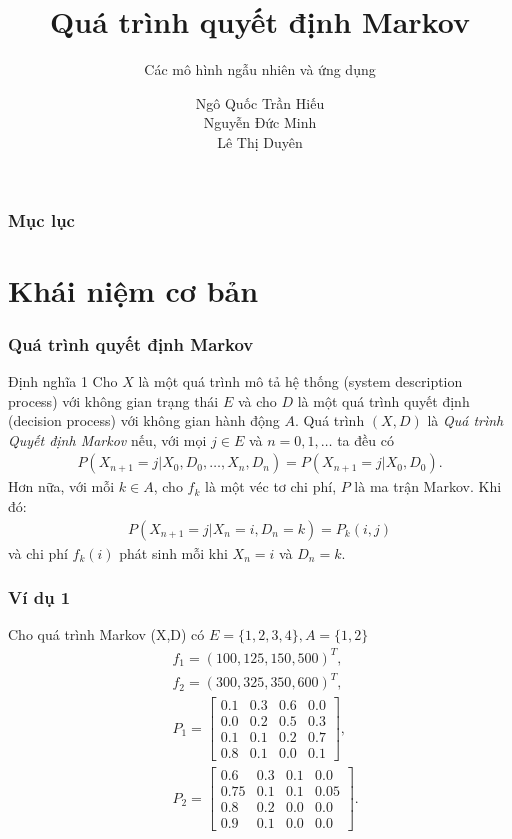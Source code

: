 \documentclass[12pt]{beamer}
\begin{document}
	\author{Ngô Quốc Trần Hiếu\\ Nguyễn Đức Minh \\Lê Thị Duyên}
    \title{\color{violet}Quá trình quyết định Markov}
	\subtitle{\color{red}Các mô hình ngẫu nhiên và ứng dụng}
	\begin{frame}[plain]
			\maketitle
	\end{frame}
	
	\begin{frame}
		\frametitle{Mục lục}
        \tableofcontents
    \end{frame}


\section{Khái niệm cơ bản}
\begin{frame}
	\frametitle{Quá trình quyết định Markov}
	\begin{block}{Định nghĩa 1}
		Cho $X$ là một quá trình mô tả hệ thống (system description process) với không gian trạng thái $E$ và cho $D$ là một quá trình quyết định (decision process) với không gian hành động $A$. Quá trình $(X,D)$ là
		\textit{Quá trình Quyết định Markov} nếu, với mọi $j\in E$ và $n=0,1,\dots$ ta đều có
		\begin{align*}
		P(X_{n+1}=j|X_0,D_0,\dots,X_n,D_n)=P(X_{n+1}=j|X_0,D_0).
		\end{align*}
		Hơn nữa, với mỗi $k\in A$, cho $f_k$ là một véc tơ chi phí, $P$ là ma trận Markov. Khi đó:
		\begin{align*}
		P(X_{n+1}=j|X_n=i, D_n=k)=P_k(i,j)
		\end{align*}
		và chi phí $f_k(i)$ phát sinh mỗi khi $X_n=i$ và $D_n=k$.
	\end{block}
\end{frame}

\begin{frame}
	\frametitle{Ví dụ 1}
	Cho quá trình Markov (X,D) có $E=\{1,2,3,4\}, A=\{1,2\}$
	\begin{align*}
	&f_1=(100,125,150,500)^T,\\
	&f_2=(300,325, 350,600)^T,\\
	&P_1=\left[
	\begin{array}{cccc}
	0.1&0.3&0.6&0.0\\
	0.0&0.2&0.5&0.3\\
	0.1&0.1&0.2&0.7\\
	0.8&0.1&0.0&0.1
	\end{array}
	\right],\\
	&P_2=\left[
	\begin{array}{cccc}
	0.6&0.3&0.1&0.0\\
	0.75&0.1&0.1&0.05\\
	0.8&0.2&0.0&0.0\\
	0.9&0.1&0.0&0.0
	\end{array}
	\right].
	\end{align*}  
\end{frame}
\end{document}
